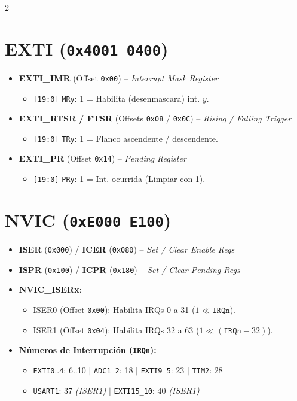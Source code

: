 \documentclass[10pt,a4paper]{article}
\begin{document}
\begin{multicols*}{2}
\section*{EXTI (\texttt{0x4001 0400})}
\begin{itemize}
    \item \textbf{EXTI\_IMR} (Offset \texttt{0x00}) -- \textit{Interrupt Mask Register}
    \begin{itemize}
        \item \texttt{[19:0]} \texttt{MRy}: 1 = Habilita (desenmascara) int. $y$.
    \end{itemize}
    \item \textbf{EXTI\_RTSR / FTSR} (Offsets \texttt{0x08} / \texttt{0x0C}) -- \textit{Rising / Falling Trigger}
    \begin{itemize}
        \item \texttt{[19:0]} \texttt{TRy}: 1 = Flanco ascendente / descendente.
    \end{itemize}
    \item \textbf{EXTI\_PR} (Offset \texttt{0x14}) -- \textit{Pending Register}
    \begin{itemize}
        \item \texttt{[19:0]} \texttt{PRy}: 1 = Int. ocurrida (Limpiar con 1).
    \end{itemize}
\end{itemize}

\section*{NVIC (\texttt{0xE000 E100})}
\begin{itemize}
    \item \textbf{ISER} (\texttt{0x000}) / \textbf{ICER} (\texttt{0x080}) -- \textit{Set / Clear Enable Regs}
    \item \textbf{ISPR} (\texttt{0x100}) / \textbf{ICPR} (\texttt{0x180}) -- \textit{Set / Clear Pending Regs}
    \item \textbf{NVIC\_ISERx}:
    \begin{itemize}
        \item ISER0 (Offset \texttt{0x00}): Habilita IRQs 0 a 31 ($1 \ll \mathtt{IRQn}$).
        \item ISER1 (Offset \texttt{0x04}): Habilita IRQs 32 a 63 ($1 \ll (\mathtt{IRQn}-32)$).
    \end{itemize}
    \item \textbf{Números de Interrupción (\texttt{IRQn}):}
    \begin{itemize}
        \item \texttt{EXTI0}..\texttt{4}: 6..10 $|$ \texttt{ADC1\_2}: 18 $|$ \texttt{EXTI9\_5}: 23 $|$ \texttt{TIM2}: 28
        \item \texttt{USART1}: 37 \textit{(ISER1)} $|$ \texttt{EXTI15\_10}: 40 \textit{(ISER1)}
    \end{itemize}
\end{itemize}


\end{multicols*}
\end{document}
